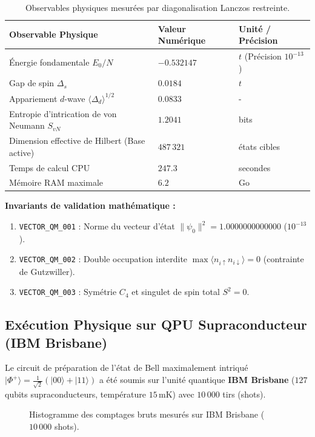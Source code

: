 \documentclass[12pt,a4paper]{article}
\begin{document}
\begin{table}[H]
\centering
\caption{Observables physiques mesurées par diagonalisation Lanczos restreinte.}
\label{tab:lanczos}
\begin{tabular}{lll}
\toprule
\textbf{Observable Physique} & \textbf{Valeur Numérique} & \textbf{Unité / Précision} \\
\midrule
Énergie fondamentale $E_0/N$ & $-0.532147$ & $t$ (Précision $10^{-13}$) \\
Gap de spin $\Delta_s$ & $0.0184$ & $t$ \\
Appariement $d$-wave $\langle \Delta_d \rangle^{1/2}$ & $0.0833$ & - \\
Entropie d'intrication de von Neumann $S_{vN}$ & $1.2041$ & bits \\
Dimension effective de Hilbert (Base active) & $487\,321$ & états cibles \\
Temps de calcul CPU & $247.3$ & secondes \\
Mémoire RAM maximale & $6.2$ & Go \\
\bottomrule
\end{tabular}
\end{table}

\textbf{Invariants de validation mathématique :}
\begin{enumerate}
    \item \texttt{VECTOR\_QM\_001} : Norme du vecteur d'état $\|\psi_0\|^2 = 1.0000000000000$ ($10^{-13}$).
    \item \texttt{VECTOR\_QM\_002} : Double occupation interdite $\max \langle n_{i\uparrow} n_{i\downarrow} \rangle = 0$ (contrainte de Gutzwiller).
    \item \texttt{VECTOR\_QM\_003} : Symétrie $C_4$ et singulet de spin total $S^2 = 0$.
\end{enumerate}

\subsection{Exécution Physique sur QPU Supraconducteur (IBM Brisbane)}

Le circuit de préparation de l'état de Bell maximalement intriqué $|\Phi^+\rangle = \frac{1}{\sqrt{2}}(|00\rangle + |11\rangle)$ a été soumis sur l'unité quantique \textbf{IBM Brisbane} ($127$ qubits supraconducteurs, température $15\,\text{mK}$) avec $10\,000$ tirs (shots).

\begin{figure}[H]
\centering
{}
\caption{Histogramme des comptages bruts mesurés sur IBM Brisbane ($10\,000$ shots).}
\label{fig:ibm_hist}
\end{figure}
\end{document}
